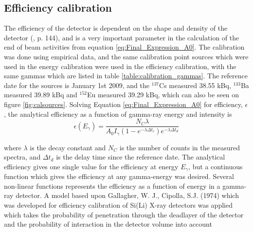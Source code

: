 \subsection{Efficiency calibration}
The efficiency of the detector is dependent on the shape and density of the detector (\cite{Gilmore2008}, p. 144), and is a very important parameter in the calculation of the end of beam activities from equation \ref{eq:Final_Expression_A0}. The calibration was done using empirical data, and the same calibration point sources which were used in the energy calibration were used in the efficiency calibration, with the same gammas which are listed in table \ref{table:calibration_gammas}. The reference date for the sources is January 1st 2009, and the $^{137}$Cs measured 38.55 kBq, $^{133}$Ba measured 39.89 kBq and $^{152}$Eu measured 39.29 kBq, which can also be seen on figure \ref{fig:calsources}. \noindent Solving Equation \ref{eq:Final_Expression_A0} for efficiency, $\epsilon$, the analytical efficiency as a function of gamma-ray energy and intensity is 
\begin{equation} \label{eq:efficiency_analytical}
    \epsilon(E_\gamma)= \frac{N_C \lambda}{A_0 I_\gamma (1-e^{-\lambda \Delta t_c})e^{-\lambda\Delta t_d}}
\end{equation}

\noindent 
where $\lambda$ is the decay constant and $N_C$ is the number of counts in the measured spectra, and $\Delta t_d$ is the delay time since the reference date. The analytical efficiency gives one single value for the efficiency at energy $E_\gamma$, but a continuous function which gives the efficiency at any gamma-energy was desired. Several non-linear functions  represents the efficiency as a function of energy in a gamma-ray detector. A model based upon Gallagher, W. J., Cipolla, S.J. (1974) which was developed for efficiency calibration of Si(Li) X-ray detectors\cite{Gallagher1974b,MatthewsEricF.LewisAmandaM.Bernstein2020} was applied which takes the probability of penetration through the deadlayer of the detector and the probability of interaction in the detector volume into account

